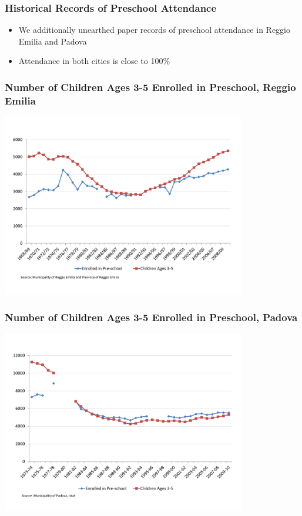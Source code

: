 \documentclass[static]{JJH-Beamer_PAGENOS}
\begin{document}
\begin{frame}
\frametitle{Historical Records of Preschool Attendance}
\begin{itemize}
	\item We additionally unearthed paper records of preschool attendance in Reggio Emilia and Padova
	\item Attendance in both cities is close to 100\% 
\end{itemize}
\end{frame}

\begin{frame}
\frametitle{Number of Children Ages 3-5 Enrolled in Preschool, Reggio Emilia}
\centering
\includegraphics[width=0.8\textwidth]{../../output/image/Enrollement_Preschool_RE.pdf}
\end{frame}

\begin{frame}
\frametitle{Number of Children Ages 3-5 Enrolled in Preschool, Padova}
\centering
\includegraphics[width=0.8\textwidth]{../../output/image/Enrollement_Preschool_Padova.pdf}
\end{frame}
\end{document}
